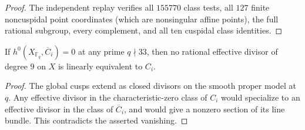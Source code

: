 \begin{proof}
The independent replay verifies all $155770$ class tests, all $127$
finite noncuspidal point coordinates (which are nonsingular affine
points), the full rational subgroup, every complement, and all ten
cuspidal class identities.
\end{proof}

\begin{lemma}\label{lem:nonic33-second-reduction}
If $h^0(X_{\mathbb F_q},\overline C_i)=0$ at any prime $q\nmid33$,
then no rational effective divisor of degree $9$ on $X$ is linearly
equivalent to $C_i$.
\end{lemma}
\begin{proof}
The global cusps extend as closed divisors on the smooth proper model
at $q$. Any effective divisor in the characteristic-zero class of
$C_i$ would specialize to an effective divisor in the class of
$\overline C_i$, and would give a nonzero section of its line bundle.
This contradicts the asserted vanishing.
\end{proof}
